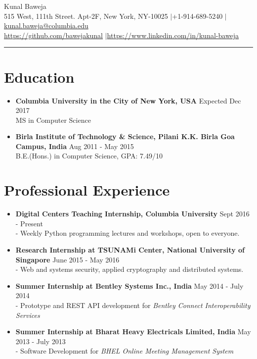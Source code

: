 \documentclass{article}
\def\name{Kunal Baweja}
\begin{document}
\begin{center}
{\huge \name}\\
515 West, 111th Street. Apt-2F, New York, NY-10025 $|$\hspace{3pt}+1-914-689-5240 $|$\hspace{3pt}\href{mailto:kunal.baweja@columbia.edu}{kunal.baweja@columbia.edu}\\
\vspace{2pt}
\href{https://github.com/bawejakunal}{https://github.com/bawejakunal} $|$\hspace{3pt}\href{https://www.linkedin.com/in/kunal-baweja}{https://www.linkedin.com/in/kunal-baweja}
\end{center}

\hrule
\vspace{5pt}

\section*{Education}
\begin{itemize}
    
    \item \textbf{Columbia University in the City of New York, USA} {\hfill Expected Dec 2017}\\
    MS in Computer Science
    
    \item \textbf{Birla Institute of Technology \& Science, Pilani K.K. Birla Goa Campus, India} {\hfill Aug 2011 - May 2015}\\
    B.E.(Hons.) in Computer Science, GPA: 7.49/10

\end{itemize}


\section*{Professional Experience}
\begin{itemize}
    \item \textbf{Digital Centers Teaching Internship, Columbia University} {\hfill Sept 2016 - Present}\\
    - Weekly Python programming lectures and workshops, open to everyone.

    \item \textbf{Research Internship at TSUNAMi Center, National University of Singapore} {\hfill June 2015 - May 2016}\\
    - Web and systems security, applied cryptography and distributed systems.
    
    \item \textbf{Summer Internship at Bentley Systems Inc., India} {\hfill May 2014 - July 2014}\\
    - Prototype and REST API development for \textit{Bentley Connect Interoperability Services}

    \item \textbf{Summer Internship at Bharat Heavy Electricals Limited, India} {\hfill May 2013 - July 2013}\\
    - Software Development for \textit{BHEL Online Meeting Management System}
\end{itemize}
\end{document}
